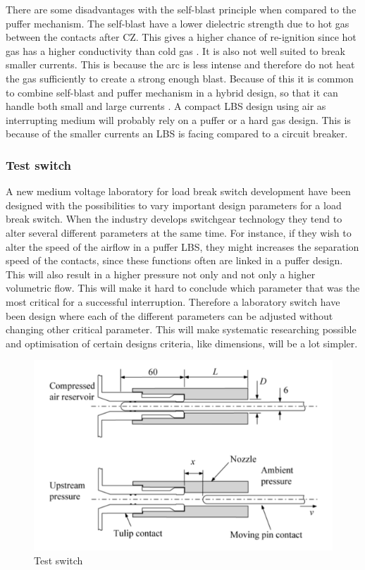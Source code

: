 \documentclass[10pt,a4paper]{article} %
\begin{document}
There are some disadvantages with the self-blast principle when compared to the puffer mechanism. The self-blast have a lower dielectric strength due to hot gas between the contacts after CZ. This gives a higher chance of re-ignition since hot gas has a higher conductivity than cold gas \cite{bib:HVEbreak}. It is also not well suited to break smaller currents. This is because the arc is less intense and therefore do not heat the gas sufficiently to create a strong enough blast. Because of this it is common to combine self-blast and puffer mechanism in a hybrid design, so that it can handle both small and large currents \cite{bib:HVEbreak}. A compact LBS design using air as interrupting medium will probably rely on a puffer or a hard gas design. This is because of the smaller currents an LBS is facing compared to a circuit breaker.


\subsubsection{Test switch}
A new medium voltage laboratory for load break switch development have been designed with the possibilities to vary important design parameters for a load break switch. When the industry develops switchgear technology they tend to alter several different parameters at the same time. For instance, if they wish to alter the speed of the airflow in a puffer LBS, they might increases the separation speed of the contacts, since these functions often are linked in a puffer design. This will also result in a higher pressure not only and not only a higher volumetric flow. This will make it hard to conclude which parameter that was the most critical for a successful interruption. Therefore a laboratory switch have been design where each of the different parameters can be adjusted without changing other critical parameter. This will make systematic researching possible and optimisation of certain designs criteria, like dimensions, will be a lot simpler.

\begin{figure} [h]
\centering
\includegraphics[scale=0.5]{Bilder/Theory/SchematicTestSwitch.png}
\caption{Test switch} \label{fig:testSwitch}
\end{figure}
\end{document}

